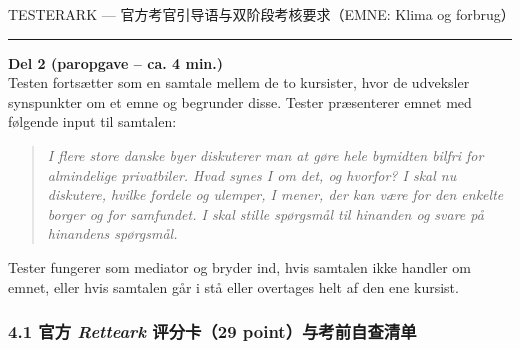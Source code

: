 \begin{emailbox}{TESTERARK --- 官方考官引导语与双阶段考核要求（EMNE: Klima og forbrug）}
\vspace{0.35em}
\hrule
\vspace{0.35em}
\textbf{\color{NCDRed}Del 2 (paropgave -- ca. 4 min.)}\\
Testen fortsætter som en samtale mellem de to kursister, hvor de udveksler synspunkter om et emne og begrunder disse. Tester præsenterer emnet med følgende input til samtalen:
\begin{quote}
\textit{I flere store danske byer diskuterer man at gøre hele bymidten bilfri for almindelige privatbiler. Hvad synes I om det, og hvorfor? I skal nu diskutere, hvilke fordele og ulemper, I mener, der kan være for den enkelte borger og for samfundet. I skal stille spørgsmål til hinanden og svare på hinandens spørgsmål.}
\end{quote}
\small\textcolor{NCDGray}{Tester fungerer som mediator og bryder ind, hvis samtalen ikke handler om emnet, eller hvis samtalen går i stå eller overtages helt af den ene kursist.}
\end{emailbox}

\clearpage
{}

\subsubsection*{4.1 官方 \textit{Retteark} 评分卡（29 point）与考前自查清单}

